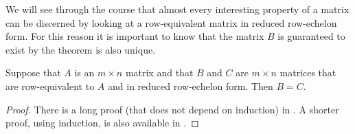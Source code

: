 \documentclass{ximera}
\begin{document}
We will see through the course that almost every interesting property
of a matrix can be discerned by looking at a row-equivalent matrix in
reduced row-echelon form.  For this reason it is important to know
that the matrix $B$ is guaranteed to exist by the theorem is also
unique.

\begin{theorem}
Suppose that $A$ is an $m\times n$ matrix and that $B$ and $C$ are $m\times n$ matrices that are row-equivalent to $A$ and in reduced row-echelon form.  Then $B=C$.

\begin{proof}
There is a long proof (that does not depend on induction) in .  A shorter proof, using induction, is also available in .
\end{proof}
\end{theorem}
\end{document}
